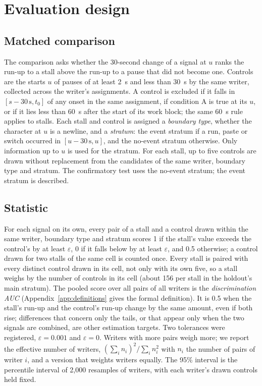 \section{Evaluation design}
\label{sec:design}

\subsection{Matched comparison}

The comparison asks whether the 30-second change of a signal at $u$ ranks the run-up to a stall above the run-up to a
pause that did not become one. Controls are the starts $u$ of pauses of at least 2~s and less than 30~s by the same
writer, collected across the writer's assignments. A control is excluded if it falls in $[s - 30\,\mathrm{s}, t_0]$ of
any onset in the same assignment, if condition A is true at its $u$, or if it lies less than 60~s after the start of its
work block; the same 60~s rule applies to stalls. Each stall and control is assigned a \emph{boundary type}, whether the
character at $u$ is a newline, and a \emph{stratum}: the event stratum if a run, paste or switch occurred in
$[u - 30\,\mathrm{s}, u]$, and the no-event stratum otherwise. Only information up to $u$ is used for the stratum. For
each stall, up to five controls are drawn without replacement from the candidates of the same writer, boundary type and
stratum. The confirmatory test uses the no-event stratum; the event stratum is described.

\subsection{Statistic}

For each signal on its own, every pair of a stall and a control drawn within the same writer, boundary type and stratum
scores 1 if the stall's value exceeds the control's by at least $\varepsilon$, 0 if it falls below by at least
$\varepsilon$, and 0.5 otherwise; a control drawn for two stalls of the same cell is counted once. Every stall is
paired with every distinct control drawn in its cell, not only with its own five, so a stall weighs by the number of
controls in its cell (about 156 per stall in the holdout's main stratum). The pooled score over
all pairs of all writers is the \emph{discrimination AUC} (Appendix~\ref{app:definitions} gives the formal definition).
It is 0.5 when the stall's run-up and the control's run-up change by the same amount, even if both rise; differences
that concern only the tails, or that appear only when the two signals are combined, are other estimation targets. Two
tolerances were registered, $\varepsilon = 0.001$ and $\varepsilon = 0$. Writers with more pairs weigh more; we report
the effective number of writers, $(\sum_i n_i)^2 / \sum_i n_i^2$ with $n_i$ the number of pairs of writer $i$, and a
version that weights writers equally. The 95\% interval is the percentile interval of 2,000 resamples of writers, with
each writer's drawn controls held fixed.


